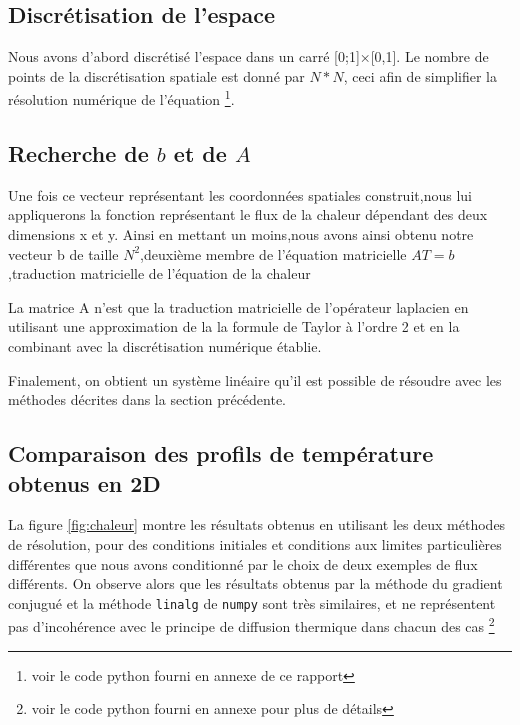 \documentclass[a4paper]{article}
\begin{document}
\subsection{Discrétisation de l'espace}

Nous avons d'abord discrétisé l'espace dans un carré [0;1]×[0,1]. Le nombre de points de la discrétisation spatiale est donné par $N*N$, ceci afin de simplifier la résolution numérique de l'équation \footnote{voir le code python fourni en annexe de ce rapport}.

\subsection{Recherche de $b$ et de $A$}

Une fois ce vecteur représentant les coordonnées spatiales construit,nous lui appliquerons la fonction représentant le flux de la chaleur dépendant des deux dimensions x et y.
Ainsi en mettant un moins,nous avons ainsi obtenu notre vecteur b de taille $N^2$,deuxième membre de l'équation matricielle $AT=b$ ,traduction matricielle de l'équation de la chaleur 

La matrice A n'est que la traduction matricielle de l'opérateur laplacien en utilisant une approximation de la la formule de Taylor à l'ordre 2 et en la combinant avec la discrétisation numérique établie.

Finalement, on obtient un système linéaire qu'il est possible de résoudre avec les méthodes décrites dans la section précédente.

\subsection{Comparaison des profils de température obtenus en 2D}

La figure \ref{fig:chaleur} montre les résultats obtenus en utilisant les deux méthodes de résolution, pour des conditions initiales et conditions aux limites particulières différentes que nous avons conditionné par le choix de deux exemples de flux différents.
On observe alors que les résultats obtenus par la méthode du gradient conjugué et la méthode \texttt{linalg} de \texttt{numpy} sont très similaires, et ne représentent pas d'incohérence avec le principe de diffusion thermique dans chacun des cas \footnote{voir le code python fourni en annexe pour plus de détails}
\end{document}

